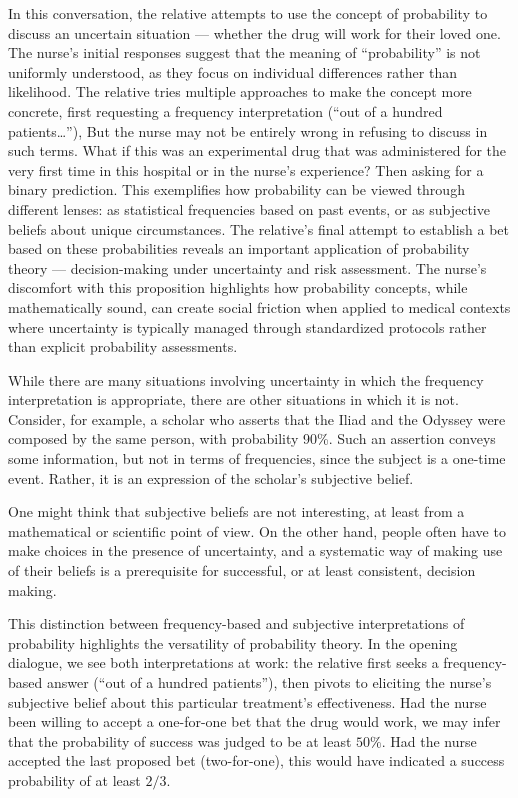 In this conversation, the relative attempts to use the concept of probability to discuss an uncertain situation --- whether the drug will work for their loved one. The nurse's initial responses suggest that the meaning of ``probability'' is not uniformly understood, as they focus on individual differences rather than likelihood. The relative tries multiple approaches to make the concept more concrete, first requesting a frequency interpretation (``out of a hundred patients\ldots''), But the nurse
may not be entirely wrong in refusing to discuss in such terms. What if this was an experimental drug that was administered for the very first time in this hospital or in the nurse's experience? Then asking for a binary prediction.  This exemplifies how probability can be viewed through different lenses: as statistical frequencies based on past events, or as subjective beliefs about unique circumstances. The relative's final attempt to establish a bet based on these probabilities reveals an important application of probability theory --- decision-making under uncertainty and risk assessment. The nurse's discomfort with this proposition highlights how probability concepts, while mathematically sound, can create social friction when applied to medical contexts where uncertainty is typically managed through standardized protocols rather than explicit probability assessments.

While there are many situations involving uncertainty in which the frequency interpretation is appropriate, there are other situations in which it is not. Consider, for example, a scholar who asserts that the Iliad and the Odyssey were composed by the same person, with probability 90\%. Such an assertion conveys some information, but not in terms of frequencies, since the subject is a one-time event. Rather, it is an expression of the scholar's subjective belief.

One might think that subjective beliefs are not interesting, at least from a mathematical or scientific point of view. On the other hand, people often have to make choices in the presence of uncertainty, and a systematic way of making use of their beliefs is a prerequisite for successful, or at least consistent, decision making.

This distinction between frequency-based and subjective interpretations of probability highlights the versatility of probability theory. In the opening dialogue, we see both interpretations at work: the relative first seeks a frequency-based answer (``out of a hundred patients''), then pivots to eliciting the nurse's subjective belief about this particular treatment's effectiveness. Had the nurse been
willing to accept a one-for-one bet that the drug would work, we may infer that the probability of success was judged to be at least \(50\%\). Had the nurse accepted the last proposed bet (two-for-one), this would have indicated a success probability of at least \(2/3\).

